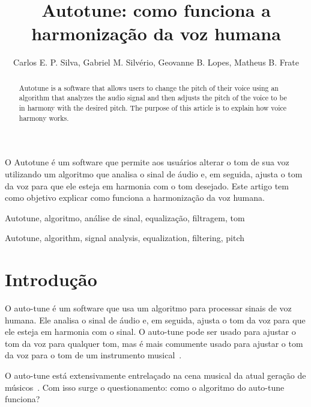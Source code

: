 \documentclass{sbrt}
\begin{document}
\title{Autotune: como funciona a harmonização da voz humana}

\author{Carlos E. P. Silva, Gabriel M. Silvério, Geovanne B. Lopes, Matheus B. Frate}

\maketitle


\begin{resumo}
O Autotune é um software que permite aos usuários alterar o tom de sua voz utilizando um algoritmo que analisa o sinal de áudio e, em seguida, ajusta o tom da voz para que ele esteja em harmonia com o tom desejado. Este artigo tem como objetivo explicar como funciona a harmonização da voz humana.
\end{resumo}
\begin{chave}
Autotune, algoritmo, análise de sinal, equalização, filtragem, tom
\end{chave}


\begin{abstract}
Autotune is a software that allows users to change the pitch of their voice using an algorithm that analyzes the audio signal and then adjusts the pitch of the voice to be in harmony with the desired pitch. The purpose of this article is to explain how voice harmony works.
\end{abstract}
\begin{keywords}
Autotune, algorithm, signal analysis, equalization, filtering, pitch
\end{keywords}


\section{Introdução}

O auto-tune é um software que usa um algoritmo para processar sinais de voz humana. Ele analisa o sinal de áudio e, em seguida, ajusta o tom da voz para que ele esteja em harmonia com o sinal. O auto-tune pode ser usado para ajustar o tom da voz para qualquer tom, mas é mais comumente usado para ajustar o tom da voz para o tom de um instrumento musical~\cite{browning2014auto}.

O auto-tune está extensivamente entrelaçado na cena musical da atual geração de músicos~\cite{diaz2009fate}. Com isso surge o questionamento: como o algoritmo do auto-tune funciona?
\end{document}
